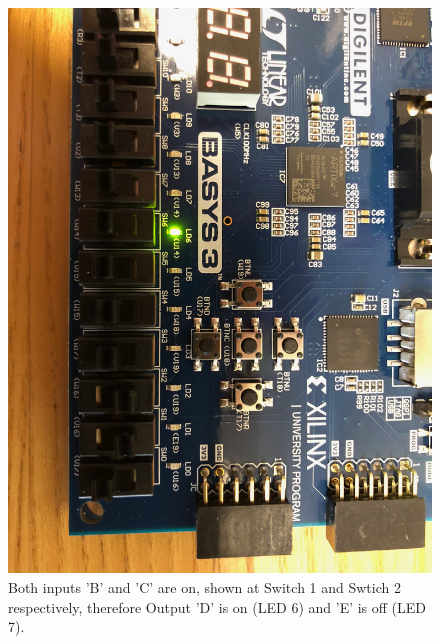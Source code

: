 \documentclass[11pt]{article}
\begin{document}
\begin{figure}[H]
	\includegraphics[width=\textwidth]{report_images/Lab1BoardPictures/Lab1Part1/IMG_0409.jpg}
	\caption{\label{fig:figure-name}Both inputs 'B' and 'C' are on, shown at Switch 1 and Swtich 2 respectively, therefore Output 'D' is on (LED 6) and 'E' is off (LED 7).}
\end{figure}
\end{document}
